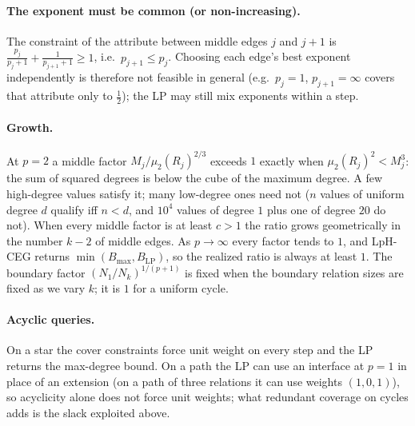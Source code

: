 \documentclass[11pt]{article}
\begin{document}
\paragraph{The exponent must be common (or non-increasing).} The
constraint of the attribute between middle edges $j$ and $j{+}1$ is
$\frac{p_j}{p_j+1}+\frac1{p_{j+1}+1}\ge1$, i.e.\ $p_{j+1}\le p_j$. Choosing
each edge's best exponent independently is therefore not feasible in
general (e.g.\ $p_j=1$, $p_{j+1}=\infty$ covers that attribute only to
$\frac12$); the LP may still mix exponents within a step.

\paragraph{Growth.} At $p=2$ a middle factor $M_j/\mu_2(R_j)^{2/3}$ exceeds
$1$ exactly when $\mu_2(R_j)^2<M_j^3$: the sum of squared degrees is
below the cube of the maximum degree. A few high-degree values satisfy it;
many low-degree ones need not ($n$ values of uniform degree $d$ qualify
iff $n<d$, and $10^4$ values of degree $1$ plus one of degree $20$ do not).
When every middle factor is at least $c>1$ the ratio grows geometrically
in the number $k-2$ of middle edges. As $p\to\infty$ every factor tends to $1$, and LpH-CEG
returns $\min(B_{\max},B_{\mathrm{LP}})$, so the realized ratio is always
at least $1$. The boundary factor $(N_1/N_k)^{1/(p+1)}$ is fixed when the boundary relation sizes are fixed as we vary
$k$; it is $1$ for a uniform cycle.

\paragraph{Acyclic queries.} On a star the cover constraints force unit
weight on every step and the LP returns the max-degree bound. On a path the
LP can use an interface at $p=1$ in place of an extension (on a path of three relations it can use weights $(1,0,1)$), so acyclicity alone does not force unit
weights; what redundant coverage on cycles adds is the slack exploited
above.
\end{document}
